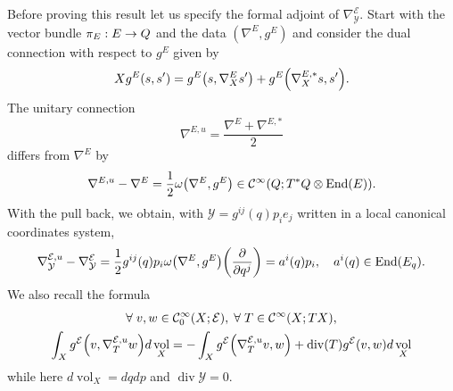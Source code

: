 \documentclass[10pt]{amsart}
\theoremstyle{definition}\newtheorem{defi}[theo]{Definition}\newtheorem{rema}[theo]{Remark}\newtheorem{exam}[theo]{Example}\newtheorem{exem}[theo]{Example}\newtheorem{nota}[theo]{Notation}
\newcommand{\clC}{\mathcal{C}}
\newcommand{\clY}{\mathcal{Y}}
\newcommand{\clE}{\mathcal{E}}
\DeclareMathOperator{\voll}{vol}
\DeclareMathOperator{\End}{End}
\DeclareMathOperator{\divv}{div}
\let\oldforall\forall
\renewcommand*{\forall}{\mathrel{\oldforall}}
\let\originalleft\left
\let\originalright\right
\renewcommand{\left}{\mathopen{}\mathclose\bgroup\originalleft}
\renewcommand{\right}{\aftergroup\egroup\originalright}
\renewcommand*{\to}{\mathchoice{\longrightarrow}{\rightarrow}{\rightarrow}{\rightarrow}}
\begin{document}
Before proving this result let us specify the formal adjoint of $\nabla_{\clY}^{\clE}$. Start with the vector bundle $\pi_{E}:E\to Q$ and the data $(\nabla^{E},g^{E})$ and consider the dual connection with respect to $g^{E}$ given by
\[
Xg^{E}(s,s')=g^{E}\left(s, \nabla^{E}_{X}s'\right)+g^{E}\left(\nabla_{X}^{E,*}s, s'\right).
\]
The unitary connection
\[
\nabla^{E,u}=\frac{\nabla^{E}+\nabla^{E,*}}{2}
\]
differs from $\nabla^{E}$ by
\[
\nabla^{E,u}-\nabla^{E}=\frac{1}{2}\omega\left(\nabla^{E},g^{E}\right)\in \clC^{\infty}(Q;T^{*}Q\otimes\End(E)).
\]
With the pull back, we obtain, with $\clY=g^{ij}(q)p_{i}e_{j}$ written in a local canonical coordinates system,
\[
\nabla^{\clE,u}_{\clY}-\nabla^{\clE}_{\clY}=\frac{1}{2}
g^{ij}(q)p_{i}\omega\left(\nabla^{E},g^{E}\right)\left(\frac{\partial}{\partial q^{j}}\right)=a^{i}(q)p_{i},\quad a^{i}(q)\in \End(E_{q}).
\]
We also recall the formula
\begin{multline*}
\forall v,w\in \clC^{\infty}_{0}(X;\clE),\;\forall T\in \clC^{\infty}(X;TX),\\
\int_{X}g^{\clE}\left(v,\nabla^{\clE,u}_{T}w\right) d\voll_X=-\int_{X}g^{\clE}\left(\nabla_{T}^{\clE,u}v,w\right) +\divv(T)g^{\clE}(v,w) d\voll_{X}
\end{multline*}
while here $d\voll_{X}=dqdp$ and $\divv \clY=0$.
\end{document}
